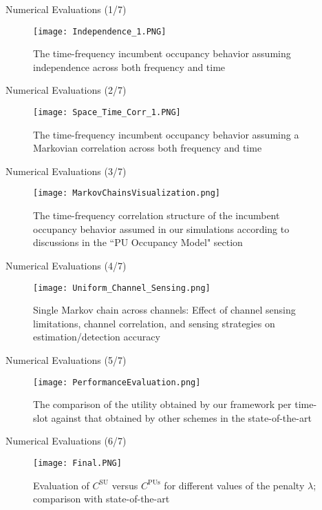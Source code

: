 \documentclass{beamer}
\begin{document}
\begin{frame}{Numerical Evaluations (1/7)}
    \begin{figure}
    \centering
    \texttt{[image: Independence\_1.PNG]}
    \caption{The time-frequency incumbent occupancy behavior assuming independence across both frequency and time}
    \label{fig:29}
\end{figure}
\end{frame}
\begin{frame}{Numerical Evaluations (2/7)}
    \begin{figure}
    \centering
    \texttt{[image: Space\_Time\_Corr\_1.PNG]}
    \caption{The time-frequency incumbent occupancy behavior assuming a Markovian correlation across both frequency and time}
    \label{fig:30}
\end{figure}
\end{frame}
\begin{frame}{Numerical Evaluations (3/7)}
    \begin{figure}
    \centering
    \texttt{[image: MarkovChainsVisualization.png]}
    \caption{The time-frequency correlation structure of the incumbent occupancy behavior assumed in our simulations according to discussions in the ``PU Occupancy Model" section}
    \label{fig:31}
\end{figure}
\end{frame}
\begin{frame}{Numerical Evaluations (4/7)}
    \begin{figure}
    \centering
    \texttt{[image: Uniform\_Channel\_Sensing.png]}
    \caption{Single Markov chain across channels: Effect of channel sensing limitations, channel correlation, and sensing strategies on estimation/detection accuracy}
    \label{fig:32}
\end{figure}
\end{frame}
\begin{frame}{Numerical Evaluations (5/7)}
    \begin{figure}
    \centering
    \texttt{[image: PerformanceEvaluation.png]}
    \caption{The comparison of the utility obtained by our framework per time-slot against that obtained by other schemes in the state-of-the-art}
    \label{fig:33}
\end{figure}
\end{frame}
\begin{frame}{Numerical Evaluations (6/7)}
    \begin{figure}
    \centering
    \texttt{[image: Final.PNG]}
    \caption{Evaluation of $C^{\text{SU}}$ versus $C^{\text{PUs}}$ for different values of the penalty $\lambda$; comparison with state-of-the-art}
    \label{fig:34}
\end{figure}
\end{frame}
\end{document}
